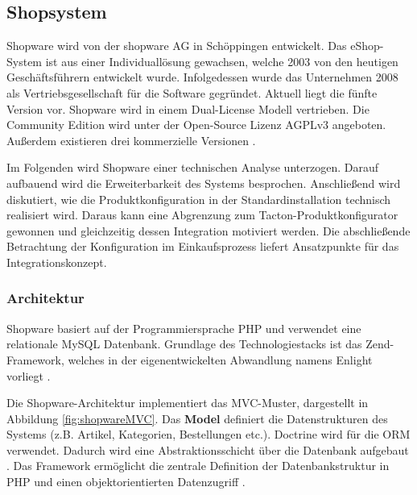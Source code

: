 \documentclass[12pt,a4paper,bibliography=totocnumbered,listof=totoc]{scrartcl}
\begin{document}
\subsection{Shopsystem}
\label{subsection:Shopsystem}

Shopware wird von der shopware AG in Schöppingen entwickelt. Das eShop-System ist aus einer Individuallösung gewachsen, welche 2003 von den heutigen Geschäftsführern entwickelt wurde. Infolgedessen wurde das Unternehmen 2008 als Vertriebsgesellschaft für die Software gegründet. Aktuell liegt die fünfte Version vor. Shopware wird in einem Dual-License Modell vertrieben. Die Community Edition wird unter der \citeauthor{gnuAGPLv3} Open-Source Lizenz \glqq AGPLv3\grqq{} angeboten. Außerdem existieren drei kommerzielle Versionen \citep{shopwareUnternehmen}.

Im Folgenden wird Shopware einer technischen Analyse unterzogen. Darauf aufbauend wird die Erweiterbarkeit des Systems besprochen. Anschließend wird diskutiert, wie die Produktkonfiguration in der Standardinstallation technisch realisiert wird. Daraus kann eine Abgrenzung zum Tacton-Produktkonfigurator gewonnen und gleichzeitig dessen Integration motiviert werden. Die abschließende Betrachtung der Konfiguration im Einkaufsprozess liefert Ansatzpunkte für das Integrationskonzept.

\subsubsection{Architektur}
\label{subsubsection:shopwareArchitektur}
Shopware basiert auf der Programmiersprache PHP und verwendet eine relationale MySQL Datenbank. Grundlage des Technologiestacks ist das Zend-Framework, welches in der eigenentwickelten Abwandlung namens Enlight vorliegt \citep{shopware5Docs}.

Die Shopware-Architektur implementiert das \ac{MVC}-Muster, dargestellt in Abbildung \ref{fig:shopwareMVC}. Das \textbf{Model} definiert die Datenstrukturen des Systems (z.B. Artikel, Kategorien, Bestellungen etc.). Doctrine wird für die \ac{ORM} verwendet. Dadurch wird eine Abstraktionsschicht über die Datenbank aufgebaut \citep{shopware5Docs}. Das Framework ermöglicht die zentrale Definition der Datenbankstruktur in PHP und einen objektorientierten Datenzugriff \citep{shopware4Docs}.
\end{document}
